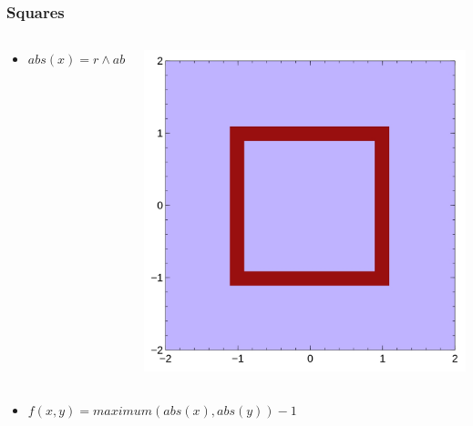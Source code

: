 \documentclass{beamer}
\begin{document}
\begin{frame}
\frametitle{Squares}
\begin{columns}
  \begin{column}{0.75\textwidth}
    \begin{itemize}
    \item $abs(x)=r \land abs(y)<r \lor abs(y)=r \land abs(x)<r$
    \end{itemize}
  \end{column}
  \begin{column}{0.25\textwidth}
    \includegraphics[width=1.0\textwidth, right]{normal_square.jpg}
  \end{column}
\end{columns}
\begin{columns}
  \begin{column}{0.75\textwidth}
    \begin{itemize}
    \item $f(x,y)=maximum(abs(x),abs(y))-1$
    \end{itemize}
  \end{column}
  \begin{column}{0.25\textwidth}

\end{column}
\end{columns}
\end{frame}
\end{document}
